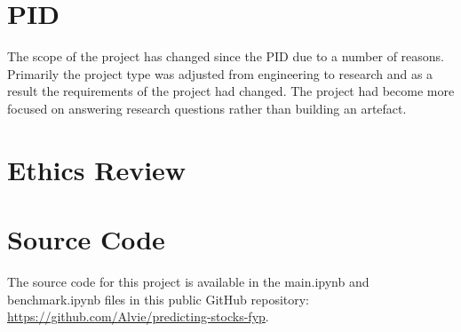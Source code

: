 \documentclass[12pt, a4paper]{report}
\begin{document}
\appendix
\chapter{PID}
The scope of the project has changed since the PID due to a number of reasons. Primarily the project
type was adjusted from engineering to research and as a result the requirements of the project had changed.
The project had become more focused on answering research questions rather than building an artefact.


\chapter{Ethics Review}


\chapter{Source Code}
The source code for this project is available in the main.ipynb and benchmark.ipynb files in this
public GitHub repository: \url{https://github.com/Alvie/predicting-stocks-fyp}.
\end{document}
